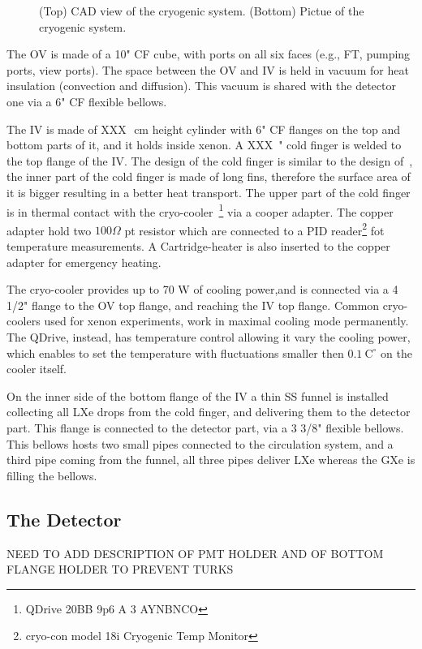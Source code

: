 \begin{figure}
\begin{subfigure}[b]{0.25\textheight}
    \end{subfigure}
        \caption{(Top) CAD view of the cryogenic system. (Bottom) Pictue of the cryogenic system. \label{fig:cryo}}
\end{figure}


The OV is made of a 10" CF cube, with ports on all six faces (e.g., FT, pumping ports, view ports). The space between the OV and IV is held 
in vacuum for heat insulation (convection and diffusion). This vacuum is shared with the detector one via a 6" CF flexible bellows.

The IV is made of XXX~\,cm height cylinder with 6" CF flanges on the top and bottom parts of it, and it holds inside xenon. A XXX~" cold 
finger is welded to the top flange of the IV. The design of the cold finger is similar to the design of~\cite{xe100_instr2012}, the inner 
part of the cold finger is made of long fins, therefore the surface area of it is bigger resulting in a better heat transport. The upper 
part of the cold finger is in thermal contact with the cryo-cooler~\footnote{QDrive 20BB 9p6 A 3 AYNBNCO} via a cooper adapter. The copper 
adapter hold two $100\Omega$ pt resistor which are connected to a PID reader\footnote{cryo-con model 18i Cryogenic Temp Monitor} fot 
temperature measurements. A Cartridge-heater is also inserted to the copper adapter for emergency heating. 

The cryo-cooler provides up to 70 W of cooling power,and is connected via a 4 1/2" flange to the OV top flange, and reaching the IV top flange. 
Common cryo-coolers used for xenon experiments, work in maximal cooling mode permanently. The QDrive, instead, has temperature control allowing 
it vary the cooling power, which enables to set the temperature with fluctuations smaller then $0.1~\mathrm{C^{\circ}}$ on the cooler itself.

On the inner side of the bottom flange of the IV a thin SS funnel is installed collecting all LXe drops from the cold finger, and delivering 
them to the  detector part. This flange is connected to the detector part, via a 3 3/8" flexible bellows. This bellows hosts two small pipes 
connected to the circulation system, and a third pipe coming from the funnel, all three pipes deliver LXe whereas the GXe is filling the bellows.
\subsection{The Detector}
\label{subsec:det}
NEED TO ADD DESCRIPTION OF PMT HOLDER AND OF BOTTOM FLANGE HOLDER TO PREVENT TURKS 

